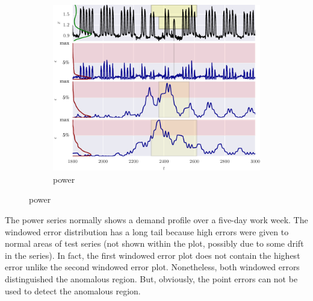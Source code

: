 \begin{figure}[!hp]
    \ContinuedFloat 

    \begin{subfigure}[t]{\textwidth} 
        \centering
        \includegraphics[]{figs/er_power.pdf}
        \caption{power}
    \end{subfigure}%

\end{figure}

The power series normally shows a demand profile over a five-day work week.
%
The windowed error distribution has a long tail because high errors were given to normal areas of test series (not shown within the plot, possibly due to some drift in the series).
%
In fact, the first windowed error plot does not contain the highest error unlike the second windowed error plot.
%
Nonetheless, both windowed errors distinguished the anomalous region.
%
But, obviously, the point errors can not be used to detect the anomalous region.



